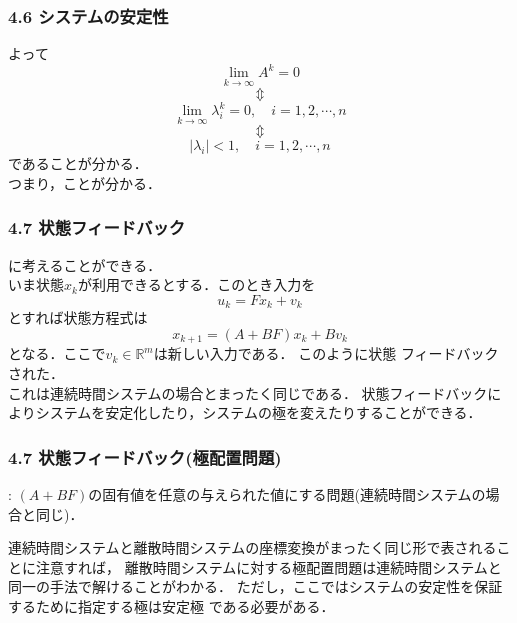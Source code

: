 \begin{frame}[t]
\frametitle{4.6 システムの安定性}
よって
\begin{equation}
 \lim_{k \rightarrow \infty} A^k = 0
\end{equation}
\[\Updownarrow\]
\begin{equation}
 \lim_{k \rightarrow \infty} \lambda_i^k = 0, \quad
  i = 1, 2, \cdots, n
\end{equation}
\[\Updownarrow\]
\begin{equation}
 \vert \lambda_i \vert < 1, \quad i = 1, 2, \cdots, n
\end{equation}
であることが分かる．\\
つまり，ことが分かる．
\end{frame}


\begin{frame}[t]
\frametitle{4.7 状態フィードバック}
に考えることができる．\\
いま状態$x_k$が利用できるとする．このとき入力を
\begin{equation}
 u_k = F x_k + v_k
\end{equation}
とすれば状態方程式は
\begin{equation}
 x_{k+1} = (A + B F)x_k + B v_k
\end{equation}
となる．ここで$v_k \in \mathbb{R}^m $は新しい入力である．
このように状態
フィードバックされた．\\
これは連続時間システムの場合とまったく同じである．
状態フィードバックによりシステムを安定化したり，システムの極を変えたりすることができる．
\end{frame}

\begin{frame}[t]
\frametitle{4.7 状態フィードバック(極配置問題)}
:
$(A+BF)$の固有値を任意の与えられた値にする問題(連続時間システムの場合と同じ)．\\

\vspace{5mm}

連続時間システムと離散時間システムの座標変換がまったく同じ形で表されることに注意すれば，
離散時間システムに対する極配置問題は連続時間システムと同一の手法で解けることがわかる．
ただし，ここではシステムの安定性を保証するために指定する極は安定極
である必要がある．
\end{frame}

